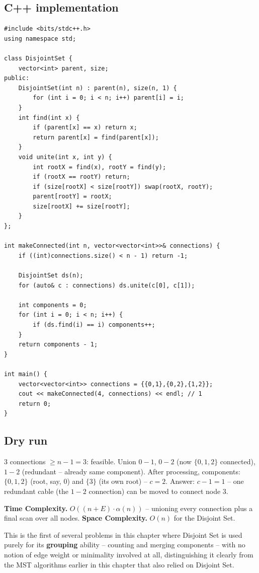 \subsection*{C++ implementation}

\begin{lstlisting}
#include <bits/stdc++.h>
using namespace std;

class DisjointSet {
    vector<int> parent, size;
public:
    DisjointSet(int n) : parent(n), size(n, 1) {
        for (int i = 0; i < n; i++) parent[i] = i;
    }
    int find(int x) {
        if (parent[x] == x) return x;
        return parent[x] = find(parent[x]);
    }
    void unite(int x, int y) {
        int rootX = find(x), rootY = find(y);
        if (rootX == rootY) return;
        if (size[rootX] < size[rootY]) swap(rootX, rootY);
        parent[rootY] = rootX;
        size[rootX] += size[rootY];
    }
};

int makeConnected(int n, vector<vector<int>>& connections) {
    if ((int)connections.size() < n - 1) return -1;

    DisjointSet ds(n);
    for (auto& c : connections) ds.unite(c[0], c[1]);

    int components = 0;
    for (int i = 0; i < n; i++) {
        if (ds.find(i) == i) components++;
    }
    return components - 1;
}

int main() {
    vector<vector<int>> connections = {{0,1},{0,2},{1,2}};
    cout << makeConnected(4, connections) << endl; // 1
    return 0;
}
\end{lstlisting}

\subsection*{Dry run}


$3$ connections $\ge n{-}1=3$: feasible. Union $0{-}1$, $0{-}2$
(now $\{0,1,2\}$ connected), $1{-}2$ (redundant -- already same
component). After processing, components: $\{0,1,2\}$ (root, say,
$0$) and $\{3\}$ (its own root) -- $c=2$. Answer: $c-1=1$ -- one
redundant cable (the $1{-}2$ connection) can be moved to connect node
$3$.

\begin{complexitybox}
\textbf{Time Complexity.} $O((n+E)\cdot\alpha(n))$ -- unioning every
connection plus a final scan over all nodes.
\textbf{Space Complexity.} $O(n)$ for the Disjoint Set.
\end{complexitybox}

\begin{takeawaybox}
This is the first of several problems in this chapter where Disjoint
Set is used purely for its \textbf{grouping} ability -- counting and
merging components -- with no notion of edge weight or minimality
involved at all, distinguishing it clearly from the MST algorithms
earlier in this chapter that also relied on Disjoint Set.
\end{takeawaybox}
